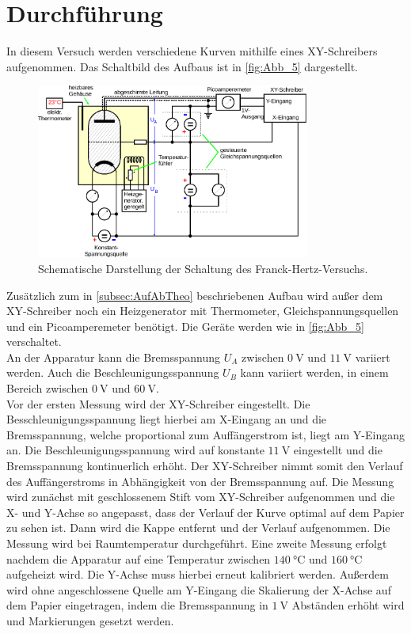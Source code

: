 \section{Durchführung}
\label{sec:Durchführung}

In diesem Versuch werden verschiedene Kurven mithilfe eines XY-Schreibers aufgenommen.
Das Schaltbild des Aufbaus ist in \autoref{fig:Abb_5} dargestellt.
\begin{figure}[H]
    \centering
    \includegraphics[width=0.8\textwidth]{build/Abb_5.pdf}
    \caption{Schematische Darstellung der Schaltung des Franck-Hertz-Versuchs\cite{V601}.}
    \label{fig:Abb_5}
\end{figure}
Zusätzlich zum in \autoref{subsec:AufAbTheo} beschriebenen Aufbau wird außer dem XY-Schreiber noch ein Heizgenerator mit Thermometer,
Gleichspannungsquellen und ein Picoamperemeter benötigt.
Die Geräte werden wie in \autoref{fig:Abb_5} verschaltet.\\

An der Apparatur kann die Bremsspannung $U_A$ zwischen $\qty{0}{\volt}$ und $\qty{11}{\volt}$ variiert werden.
Auch die Beschleunigungsspannung $U_B$ kann variiert werden, in einem Bereich zwischen $\qty{0}{\volt}$ und $\qty{60}{\volt}$.\\

Vor der ersten Messung wird der XY-Schreiber eingestellt.
Die Besschleunigungsspannung liegt hierbei am X-Eingang an und die Bremsspannung, welche proportional zum Auffängerstrom ist, liegt am Y-Eingang an.
Die Beschleunigungsspannung wird auf konstante $\qty{11}{\volt}$ eingestellt und die Bremsspannung kontinuerlich erhöht.
Der XY-Schreiber nimmt somit den Verlauf des Auffängerstroms in Abhängigkeit von der Bremsspannung auf.
Die Messung wird zunächst mit geschlossenem Stift vom XY-Schreiber aufgenommen und die X- und Y-Achse so angepasst, dass der 
Verlauf der Kurve optimal auf dem Papier zu sehen ist. Dann wird die Kappe entfernt und der Verlauf aufgenommen.
Die Messung wird bei Raumtemperatur durchgeführt.
Eine zweite Messung erfolgt nachdem die Apparatur auf eine Temperatur zwischen $\qty{140}{\celsius}$ und $\qty{160}{\celsius}$
aufgeheizt wird. Die Y-Achse muss hierbei erneut kalibriert werden.
Außerdem wird ohne angeschlossene Quelle am Y-Eingang die Skalierung der X-Achse auf dem Papier eingetragen, indem die Bremsspannung
in $\qty{1}{\volt}$ Abständen erhöht wird und Markierungen gesetzt werden.\\

